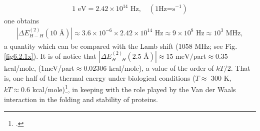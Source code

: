 \begin{subappendices}
\begin{align}
1\text{ eV}=2.42\times 10^{14}\text{ Hz},\quad(1\text{Hz=s}^{-1})  
   \end{align}  
 one obtains
\begin{align}\label{eq2.D.21}
|\Delta E_{H-H}^{(2)}(10\text{ \AA})|\approx3.6\times 10^{-6}\times 2.42\times 10^{14}\text{ Hz}\approx9\times10^8\text{ Hz}\approx10^3\text{ MHz},      
\end{align} 
 a quantity which can be compared with the Lamb shift (1058 MHz; see Fig. \ref{fig6.2.1x}). It is of notice that $|\Delta E_{H-H}^{(2)}(2.5\text{ \AA})|\approx15\text{ meV}/$part$\approx0.35$ kcal/mole, (1meV/part$\approx0.02306$ kcal/mole), a value of the order of $kT/2$. That is, one half of the thermal energy under biological conditions ($T\approx$ 300 K, $kT\approx 0.6$ kcal/mole)\footnote{\cite{Huang:05}.}, in keeping with the role played by the Van der Waals interaction in the folding and stability of proteins.










\end{subappendices}










%
%


